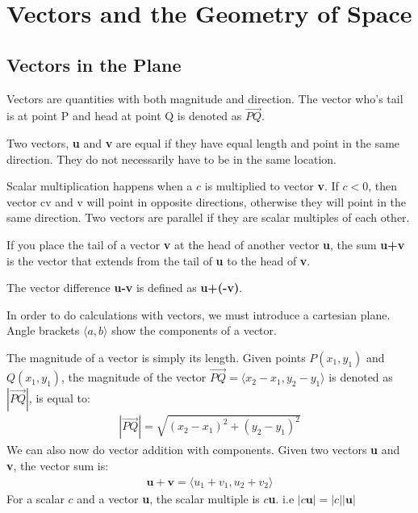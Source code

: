 \documentclass[../calc3.tex]{subfiles}
\begin{document}
\chapter{Vectors and the Geometry of Space}
\section{Vectors in the Plane}
Vectors are quantities with both magnitude and direction. The vector who's tail is at point P and head at point Q is denoted as $\overrightarrow{PQ}$.

Two vectors, \textbf{u} and \textbf{v} are equal if they have equal length and point in the same direction. They do not necessarily have to be in the same location.

Scalar multiplication happens when a $c$ is multiplied to vector \textbf{v}. If $c<0$, then vector cv and v will point in opposite directions, otherwise they will point in the same direction. Two vectors are parallel if they are scalar multiples of each other.

If you place the tail of a vector \textbf{v} at the head of another vector \textbf{u}, the sum \textbf{u+v} is the vector that extends from the tail of \textbf{u} to the head of \textbf{v}.

The vector difference \textbf{u-v} is defined as \textbf{u+(-v)}.

In order to do calculations with vectors, we must introduce a cartesian plane. Angle brackets $\langle{a,b}\rangle$ show the components of a vector.

The magnitude of a vector is simply its length. Given points $P(x_1,y_1)$ and $Q(x_1,y_1)$, the magnitude of the vector $\vec{PQ}=\langle{x_2-x_1,y_2-y_1}\rangle$ is denoted as $|\vec{PQ}|$, is equal to:
\begin{align*}
    |\vec{PQ}|=\sqrt{(x_2-x_1)^2+(y_2-y_1)^2}
\end{align*} 
We can also now do vector addition with components. Given two vectors \textbf{u} and \textbf{v}, the vector sum is:
\begin{align*}
    \textbf{u}+\textbf{v}=\langle{u_1+v_1,u_2+v_2}\rangle
\end{align*}
For a scalar $c$ and a vector \textbf{u}, the scalar multiple is $c$\textbf{u}. i.e $|c\textbf{u}|=|c||\textbf{u}|$
\end{document}
